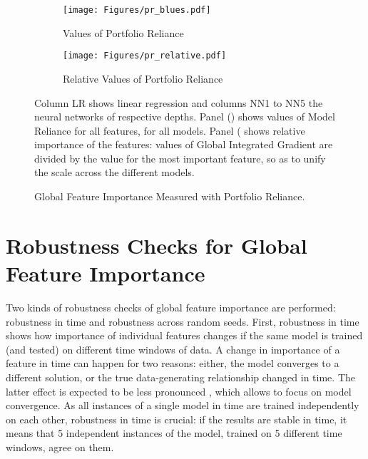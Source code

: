 		\begin{figure}	
			\centering		
			\begin{subfigure}[t]{\textwidth}
				\texttt{[image: Figures/pr\_blues.pdf]}
				\caption{Values of Portfolio Reliance}
				\label{fig:pr_blues}
			\end{subfigure}
			
			\begin{subfigure}[t]{\textwidth}
				\centering
				\texttt{[image: Figures/pr\_relative.pdf]}
				\caption{Relative Values of Portfolio Reliance}
				\label{fig:pr_relative}
			\end{subfigure}
			\caption{Global Feature Importance Measured with Portfolio Reliance.}
			\medskip
			\small
			Column LR shows linear regression and columns NN1 to NN5 the neural networks of respective depths. Panel () shows values of Model Reliance for all features, for all models.  Panel ( shows relative importance of the features: values of Global Integrated Gradient are divided by the value for the most important feature, so as to unify the scale across the different models.
			\label{fig:pr_ensemble}
		\end{figure}
		
		
	\section{Robustness Checks for Global Feature Importance}
		\label{chap:robustness}
		
		Two kinds of robustness checks of global feature importance are performed: robustness in time and robustness across random seeds. First, robustness in time shows how importance of individual features changes if the same model is trained (and tested) on different time windows of data. A change in importance of a feature in time can happen for two reasons: either, the model converges to a different solution, or the true data-generating relationship changed in time. The latter effect is expected to be less pronounced \cite{gu2020empirical}, which allows to focus on model convergence. As all instances of a single model in time are trained independently on each other, robustness in time is crucial: if the results are stable in time, it means that 5 independent instances of the model, trained on 5 different time windows, agree on them.  
		
